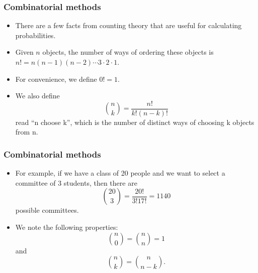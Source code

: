 \documentclass[handout]{beamer}
\begin{document}
\begin{frame}\frametitle{Combinatorial methods}
\begin{scriptsize}


\begin{itemize} 
 \item There are a few facts from counting theory that are useful for calculating probabilities.
 \item Given $n$ objects, the number of ways of ordering these objects is $n!=n(n-1)(n-2)\cdots3\cdot2\cdot1$.
 \item For convenience, we define $0!=1$.
 \item We also define 
 \begin{displaymath}
  {n \choose k} = \frac{n!}{k!(n-k)!}
 \end{displaymath}
read ``n choose k'', which is the number of distinct ways of choosing k objects from n.
\end{itemize} 

\end{scriptsize} 

\end{frame}

\begin{frame}\frametitle{Combinatorial methods}
\begin{scriptsize}


\begin{itemize} 
\item For example, if we have a class of 20 people and we want to select a committee of 3 students, then there are
 \begin{displaymath}
  {20 \choose 3} = \frac{20!}{3!17!}=1140
 \end{displaymath}
 possible committees.
 \item We note the following properties: 
 \begin{displaymath}
  {n \choose 0} = {n \choose n}=1
 \end{displaymath}
and
 \begin{displaymath}
  {n \choose k} = {n \choose n-k}.
 \end{displaymath}

 
 
\end{itemize} 
 
\end{scriptsize} 

\end{frame}
\end{document}
